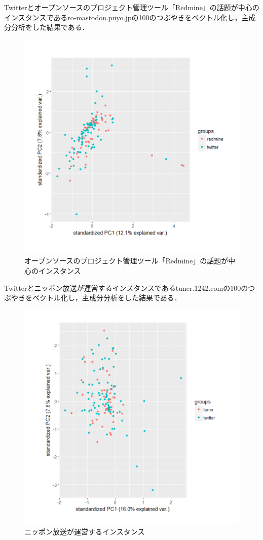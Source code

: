Twitterとオープンソースのプロジェクト管理ツール「Redmine」の話題が中心のインスタンスであるro-mastodon.puyo.jpの100のつぶやきをベクトル化し，主成分分析をした結果である．
\begin{figure}[h]
\centering
\includegraphics[width=13cm,clip]{redmine.pdf}
\caption{オープンソースのプロジェクト管理ツール「Redmine」の話題が中心のインスタンス}\label{redmine}
\end{figure}
\newpage

Twitterとニッポン放送が運営するインスタンスであるtuner.1242.comの100のつぶやきをベクトル化し，主成分分析をした結果である．
\begin{figure}[h]
\centering
\includegraphics[width=13cm,clip]{tuner.pdf}
\caption{ニッポン放送が運営するインスタンス}\label{tuner}
\end{figure}
\newpage

